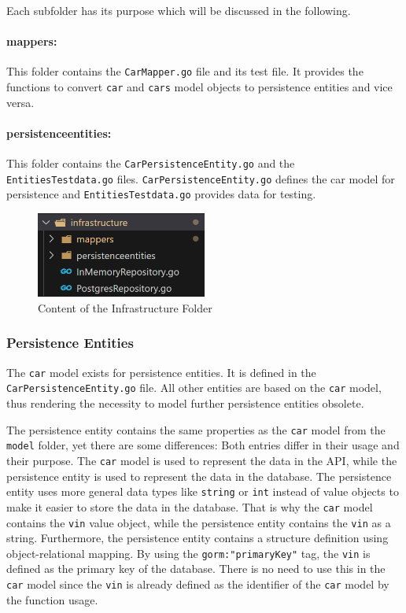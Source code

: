 Each subfolder has its purpose which will be discussed in the following.
\paragraph*{mappers:}
This folder contains the \texttt{CarMapper.go} file and its test file.
It provides the functions to convert \texttt{car} and \texttt{cars} model objects to persistence entities and vice versa.

\paragraph*{persistenceentities:}
This folder contains the \texttt{CarPersistenceEntity.go} and the \texttt{EntitiesTestdata.go} files.
\texttt{CarPersistenceEntity.go} defines the car model for persistence and \texttt{EntitiesTestdata.go} provides data for testing.
\begin{figure}
    \centering
    \includegraphics[width=0.5\textwidth]{figures/microservices/dmCar/ms_dmCar_infrastructureFolder.png}
    \caption{Content of the Infrastructure Folder}
    \label{fig:ms_dmCar_infrastructureFolder}
\end{figure}

\subsubsection*{Persistence Entities}
The \texttt{car} model exists for persistence entities.
It is defined in the \texttt{CarPersistenceEntity.go} file.
All other entities are based on the \texttt{car} model, thus rendering the necessity to model further persistence entities obsolete.

The persistence entity contains the same properties as the \texttt{car} model from the \texttt{model} folder, yet there are some differences:
Both entries differ in their usage and their purpose.
The \texttt{car} model is used to represent the data in the API, while the persistence entity is used to represent the data in the database.
The persistence entity uses more general data types like \texttt{string} or \texttt{int} instead of value objects to make it easier to store the data in the database.
That is why the \texttt{car} model contains the \texttt{vin} value object, while the persistence entity contains the \texttt{vin} as a string.
Furthermore, the persistence entity contains a structure definition using object-relational mapping.
By using the \texttt{gorm:"primaryKey"} tag, the \texttt{vin} is defined as the primary key of the database.
There is no need to use this in the \texttt{car} model since the \texttt{vin} is already defined as the identifier of the \texttt{car} model by the function usage.

